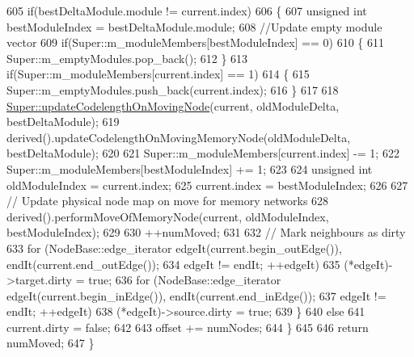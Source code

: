 \begin{DoxyCode}
605         \textcolor{keywordflow}{if}(bestDeltaModule.module != current.index)
606         \{
607             \textcolor{keywordtype}{unsigned} \textcolor{keywordtype}{int} bestModuleIndex = bestDeltaModule.module;
608             \textcolor{comment}{//Update empty module vector}
609             \textcolor{keywordflow}{if}(Super::m\_moduleMembers[bestModuleIndex] == 0)
610             \{
611                 Super::m\_emptyModules.pop\_back();
612             \}
613             \textcolor{keywordflow}{if}(Super::m\_moduleMembers[current.index] == 1)
614             \{
615                 Super::m\_emptyModules.push\_back(current.index);
616             \}
617 
618             \mbox{\hyperlink{classInfomapGreedySpecialized_a6f4ff75d89a26f1b474ca5a2190878c7}{Super::updateCodelengthOnMovingNode}}(current, oldModuleDelta,
       bestDeltaModule);
619             derived().updateCodelengthOnMovingMemoryNode(oldModuleDelta, bestDeltaModule);
620 
621             Super::m\_moduleMembers[current.index] -= 1;
622             Super::m\_moduleMembers[bestModuleIndex] += 1;
623 
624             \textcolor{keywordtype}{unsigned} \textcolor{keywordtype}{int} oldModuleIndex = current.index;
625             current.index = bestModuleIndex;
626 
627             \textcolor{comment}{// Update physical node map on move for memory networks}
628             derived().performMoveOfMemoryNode(current, oldModuleIndex, bestModuleIndex);
629 
630             ++numMoved;
631 
632             \textcolor{comment}{// Mark neighbours as dirty}
633             \textcolor{keywordflow}{for} (NodeBase::edge\_iterator edgeIt(current.begin\_outEdge()), endIt(current.end\_outEdge());
634                     edgeIt != endIt; ++edgeIt)
635                 (*edgeIt)->target.dirty = \textcolor{keyword}{true};
636             for (NodeBase::edge\_iterator edgeIt(current.begin\_inEdge()), endIt(current.end\_inEdge());
637                     edgeIt != endIt; ++edgeIt)
638                 (*edgeIt)->source.dirty = \textcolor{keyword}{true};
639         \}
640         \textcolor{keywordflow}{else}
641             current.dirty = \textcolor{keyword}{false};
642 
643         offset += numNodes;
644     \}
645 
646     \textcolor{keywordflow}{return} numMoved;
647 \}
\end{DoxyCode}
\mbox{\label{classInfomapGreedyCommon_aebf032fcd793b9496e5b1952cb14c233}} 
